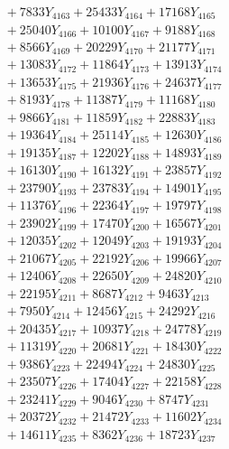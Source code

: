 \documentclass[a4paper,10pt]{article}
\begin{document}
{\begin{align}
&\;  + 7833 Y_{4163} + 25433 Y_{4164} + 17168 Y_{4165} \\[0.3ex]
&\;  + 25040 Y_{4166} + 10100 Y_{4167} + 9188 Y_{4168} \\[0.5ex]\allowbreak
&\;  + 8566 Y_{4169} + 20229 Y_{4170} + 21177 Y_{4171} \\[0.3ex]
&\;  + 13083 Y_{4172} + 11864 Y_{4173} + 13913 Y_{4174} \\[0.3ex]
&\;  + 13653 Y_{4175} + 21936 Y_{4176} + 24637 Y_{4177} \\[0.3ex]
&\;  + 8193 Y_{4178} + 11387 Y_{4179} + 11168 Y_{4180} \\[0.3ex]
&\;  + 9866 Y_{4181} + 11859 Y_{4182} + 22883 Y_{4183} \\[0.3ex]
&\;  + 19364 Y_{4184} + 25114 Y_{4185} + 12630 Y_{4186} \\[0.3ex]
&\;  + 19135 Y_{4187} + 12202 Y_{4188} + 14893 Y_{4189} \\[0.3ex]
&\;  + 16130 Y_{4190} + 16132 Y_{4191} + 23857 Y_{4192} \\[0.3ex]
&\;  + 23790 Y_{4193} + 23783 Y_{4194} + 14901 Y_{4195} \\[0.3ex]
&\;  + 11376 Y_{4196} + 22364 Y_{4197} + 19797 Y_{4198} \\[0.5ex]\allowbreak
&\;  + 23902 Y_{4199} + 17470 Y_{4200} + 16567 Y_{4201} \\[0.3ex]
&\;  + 12035 Y_{4202} + 12049 Y_{4203} + 19193 Y_{4204} \\[0.3ex]
&\;  + 21067 Y_{4205} + 22192 Y_{4206} + 19966 Y_{4207} \\[0.3ex]
&\;  + 12406 Y_{4208} + 22650 Y_{4209} + 24820 Y_{4210} \\[0.3ex]
&\;  + 22195 Y_{4211} + 8687 Y_{4212} + 9463 Y_{4213} \\[0.3ex]
&\;  + 7950 Y_{4214} + 12456 Y_{4215} + 24292 Y_{4216} \\[0.3ex]
&\;  + 20435 Y_{4217} + 10937 Y_{4218} + 24778 Y_{4219} \\[0.3ex]
&\;  + 11319 Y_{4220} + 20681 Y_{4221} + 18430 Y_{4222} \\[0.3ex]
&\;  + 9386 Y_{4223} + 22494 Y_{4224} + 24830 Y_{4225} \\[0.3ex]
&\;  + 23507 Y_{4226} + 17404 Y_{4227} + 22158 Y_{4228} \\[0.5ex]\allowbreak
&\;  + 23241 Y_{4229} + 9046 Y_{4230} + 8747 Y_{4231} \\[0.3ex]
&\;  + 20372 Y_{4232} + 21472 Y_{4233} + 11602 Y_{4234} \\[0.3ex]
&\;  + 14611 Y_{4235} + 8362 Y_{4236} + 18723 Y_{4237} \\[0.3ex]

\end{align}}
\end{document}

